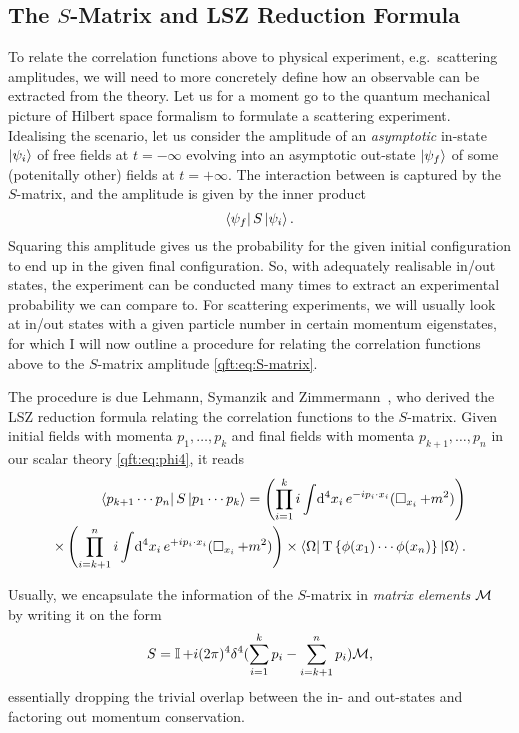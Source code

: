 \documentclass[../main.tex]{subfiles}
\begin{document}
\subsection{The \(S\)-Matrix and LSZ Reduction Formula}
To relate the correlation functions above to physical experiment, e.g.\ scattering amplitudes, we will need to more concretely define how an observable can be extracted from the theory.
Let us for a moment go to the quantum mechanical picture of Hilbert space formalism to formulate a scattering experiment.
Idealising the scenario, let us consider the amplitude of an \emph{asymptotic} in-state \(\left| \psi_i \right\rangle\) of free fields at \(t=-\infty\) evolving into an asymptotic out-state \(\left| \psi_f \right\rangle\) of some (potenitally other) fields at \(t=+\infty\).
The interaction between is captured by the \(S\)-matrix, and the amplitude is given by the inner product
\begin{equation}
  \label{qft:eq:S-matrix}
  \left\langle \psi_f \right| S \left| \psi_i \right\rangle.
\end{equation}
Squaring this amplitude gives us the probability for the given initial configuration to end up in the given final configuration.
So, with adequately realisable in/out states, the experiment can be conducted many times to extract an experimental probability we can compare to.
For scattering experiments, we will usually look at in/out states with a given particle number in certain momentum eigenstates, for which I will now outline a procedure for relating the correlation functions above to the \(S\)-matrix amplitude \cref{qft:eq:S-matrix}.

The procedure is due Lehmann, Symanzik and Zimmermann~\cite{LSZ}, who derived the LSZ reduction formula relating the correlation functions to the \(S\)-matrix.
Given initial fields with momenta \(p_1, \ldots, p_k\) and final fields with momenta \(p_{k+1}, \ldots, p_n\) in our scalar theory \cref{qft:eq:phi4}, it reads~\cite{Schwartz:2014sze}
\begin{align}
  \label{qft:eq:LSZ_S-matrix}
  \nonumber
  \left\langle p_{k+1}\cdots p_n \right| S \left| p_1 \cdots p_k \right\rangle = \left(\prod_{i=1}^k i \int \!\mathrm{d}^4x_i\, e^{-ip_i \cdot x_i} (\operatorname{\Box}_{x_i} + m^2)\right) \\
  \times \left(\prod_{i=k+1}^n i \int \!\mathrm{d}^4x_i\, e^{+ip_i \cdot x_i} (\operatorname{\Box}_{x_i} + m^2)\right)
  \times \left\langle \Omega \right| \operatorname{T}\left\{\phi(x_1)\cdots \phi(x_n)\right\} \left| \Omega \right\rangle.
\end{align}

Usually, we encapsulate the information of the \(S\)-matrix in \emph{matrix elements} \(\mathcal{M}\) by writing it on the form
\begin{equation}
  S = \operatorname{\mathbb{I}} + i(2\pi)^4 \delta^4(\sum_{i=1}^k p_i - \sum_{i=k+1}^n p_i) \mathcal{M},
\end{equation}
essentially dropping the trivial overlap between the in- and out-states and factoring out momentum conservation.
\medskip
\end{document}
